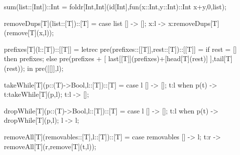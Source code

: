 \documentclass[5p,times]{elsarticle}
\begin{document}
\begin{FigESL}
sum(list::[Int])::Int = 
  foldr[Int,Int](id[Int],fun(x::Int,y::Int)::Int x+y,0,list);

removeDups[T](list::[T])::[T] =
  case list {
    [] -> [];
    x:l -> x:removeDups[T](remove[T](x,l));
  }
  
prefixes[T](l::[T])::[[T]] =
  letrec pre(prefixes::[[T]],rest::[T])::[[T]] = 
    if rest = []
    then prefixes;
    else pre(prefixes + [ 
           last[[T]](prefixes)+[head[T](rest)] 
         ],tail[T](rest));
  in pre([[]],l);

takeWhile[T](p::(T)->Bool,l::[T])::[T] =
  case l {
    [] -> [];
    t:l when p(t) -> t:takeWhile[T](p,l);
    t:l -> [];
  }

dropWhile[T](p::(T)->Bool,l::[T])::[T] =
  case l {
    [] -> [];
    t:l when p(t) -> dropWhile[T](p,l);
    l -> l;
  } 
  
removeAll[T](removables::[T],l::[T])::[T] =
  case removables {
    [] -> l;
    t:r -> removeAll[T](r,remove[T](t,l));
  }
\end{FigESL}
\end{document}
